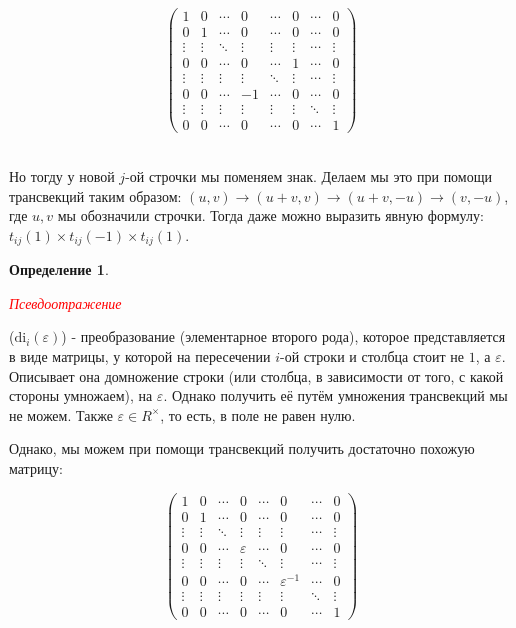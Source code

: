 \documentclass[a4paper,100pt]{article}
\theoremstyle{indented}
\theoremstyle{definition}
\newtheorem{defn}{Определение}
\theoremstyle{remark}
\begin{document}
\begin{equation*}
    \begin{pmatrix}
        1 & 0 & \cdots & 0 & \cdots & 0 & \cdots & 0 \\
        0 & 1 & \cdots & 0 & \cdots & 0 & \cdots & 0 \\
        \vdots & \vdots & \ddots & \vdots & \vdots & \vdots & \cdots & \vdots \\
        0 & 0 & \cdots & 0 & \cdots & 1 & \cdots & 0 \\
        \vdots & \vdots & \vdots & \vdots & \ddots & \vdots & \cdots & \vdots \\
        0 & 0 & \cdots & -1 & \cdots & 0 & \cdots & 0 \\
        \vdots & \vdots & \vdots & \vdots & \vdots & \vdots & \ddots & \vdots \\
        0 & 0 & \cdots & 0 & \cdots & 0 & \cdots & 1
    \end{pmatrix}
\end{equation*}\

Но тогду у новой $j$-ой строчки мы поменяем знак. Делаем мы это при помощи трансвекций таким образом: $(u,v)\rightarrow (u+v, v)\rightarrow (u+v, -u)\rightarrow (v, -u)$, где $u, v$ мы обозначили строчки. Тогда даже можно выразить явную формулу: $t_{ij}(1)\times t_{ij}(-1)\times t_{ij}(1)$.\ 

\begin{defn}
    \hypertarget{n59}{\textcolor{red}{\textit{Псевдоотражение}}} ($\text{di}_i(\varepsilon)$) - преобразование (элементарное второго рода), которое представляется в виде матрицы, у которой на пересечении $i$-ой строки и столбца стоит не $1$, а $\varepsilon$. Описывает она домножение строки (или столбца, в зависимости от того, с какой стороны умножаем), на $\varepsilon$. Однако получить её путём умножения трансвекций мы не можем. Также $\varepsilon \in R^\times$, то есть, в поле не равен нулю.
\end{defn}

Однако, мы можем при помощи трансвекций получить достаточно похожую матрицу:

\begin{equation*}
    \begin{pmatrix}
        1 & 0 & \cdots & 0 & \cdots & 0 & \cdots & 0 \\
        0 & 1 & \cdots & 0 & \cdots & 0 & \cdots & 0 \\
        \vdots & \vdots & \ddots & \vdots & \vdots & \vdots & \cdots & \vdots \\
        0 & 0 & \cdots & \varepsilon & \cdots & 0 & \cdots & 0 \\
        \vdots & \vdots & \vdots & \vdots & \ddots & \vdots & \cdots & \vdots \\
        0 & 0 & \cdots & 0 & \cdots & \varepsilon^{-1} & \cdots & 0 \\
        \vdots & \vdots & \vdots & \vdots & \vdots & \vdots & \ddots & \vdots \\
        0 & 0 & \cdots & 0 & \cdots & 0 & \cdots & 1
    \end{pmatrix}
\end{equation*}\
\end{document}
